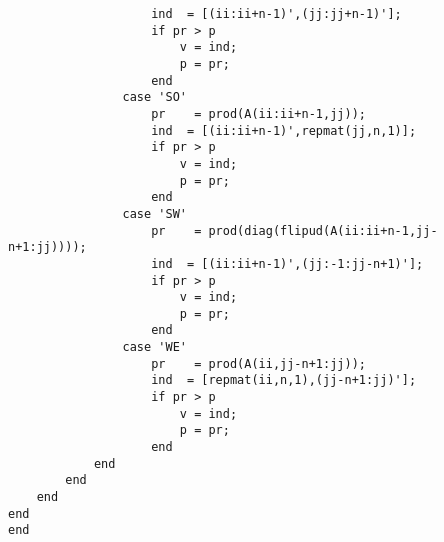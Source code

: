 \documentclass[10pt]{article}
\begin{document}
\begin{lstlisting}
                    ind  = [(ii:ii+n-1)',(jj:jj+n-1)'];
                    if pr > p
                        v = ind;
                        p = pr;
                    end
                case 'SO'
                    pr    = prod(A(ii:ii+n-1,jj));
                    ind  = [(ii:ii+n-1)',repmat(jj,n,1)];
                    if pr > p
                        v = ind;
                        p = pr;
                    end
                case 'SW'
                    pr    = prod(diag(flipud(A(ii:ii+n-1,jj-n+1:jj))));
                    ind  = [(ii:ii+n-1)',(jj:-1:jj-n+1)'];
                    if pr > p
                        v = ind;
                        p = pr;
                    end
                case 'WE'
                    pr    = prod(A(ii,jj-n+1:jj));
                    ind  = [repmat(ii,n,1),(jj-n+1:jj)'];
                    if pr > p
                        v = ind;
                        p = pr;
                    end
            end
        end
    end
end
end
\end{lstlisting}
\end{document}
